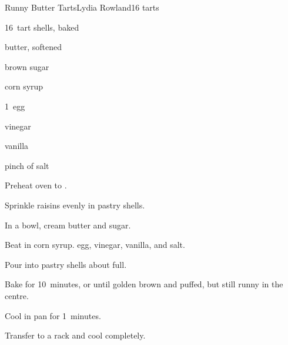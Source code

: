 \begin{recipe}{Runny Butter Tarts}{Lydia Rowland}{16 tarts}

\begin{ingredients}
\item 16~tart shells, baked
\item \C{\quarter} 
\item \C{\quarter} butter, softened
\item \C{\half} brown sugar
\item \C{\half} corn syrup
\item 1~egg
\item {} vinegar
\item {} vanilla
\item pinch of salt
\end{ingredients}

\begin{directions}
\item Preheat oven to .
\item Sprinkle raisins evenly in pastry shells.
\item In a bowl, cream butter and sugar.
\item Beat in corn syrup. egg, vinegar, vanilla, and salt.
\item Pour into pastry shells about \threequarter{} full.
\item Bake for 10~minutes, or until golden brown and puffed, but still runny in the centre.
\item Cool in pan for 1~minutes.
\item Transfer to a rack and cool completely.
\end{directions}

\end{recipe}
